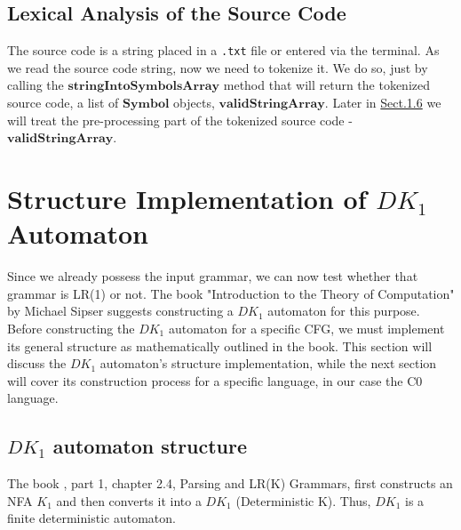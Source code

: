 \vspace{30pt}

\subsection{Lexical Analysis of the Source Code}

The source code is a string placed in a \texttt{.txt} file or entered via the terminal. As we read the source code string, now we need to tokenize it. We do so, just by calling the \(\boldsymbol{stringIntoSymbolsArray}\) method that will return the tokenized source code, a list of \(\boldsymbol{Symbol}\) objects, \(\boldsymbol{validStringArray}\). Later in \hyperref[sec:Pre-processing for C0 Source Code]{Sect.1.6} we will treat the pre-processing part of the tokenized source code - \(\boldsymbol{validStringArray}\).

\newpage


\section{Structure Implementation of \(DK_{1}\) Automaton}\label{sec:Structure Implementation of DK1 Automaton}

Since we already possess the input grammar, we can now test whether that grammar is LR(1) or not. The book "Introduction to the Theory of Computation" by Michael Sipser \cite{sipser} suggests constructing a \( DK_{1} \) automaton for this purpose. Before constructing the \( DK_{1} \) automaton for a specific CFG, we must implement its general structure as mathematically outlined in the book. This section will discuss the \( DK_{1} \) automaton’s structure implementation, while the next section will cover its construction process for a specific language, in our case the C0 language.

\vspace{15pt}

\subsection{\(DK_{1}\) automaton structure}

The book \cite{sipser}, part 1, chapter 2.4, Parsing and LR(K) Grammars, first constructs an NFA \(K_{1}\) and then converts it into a \( DK_{1}\) (Deterministic K). Thus, \( DK_{1}\) is a finite deterministic automaton.

